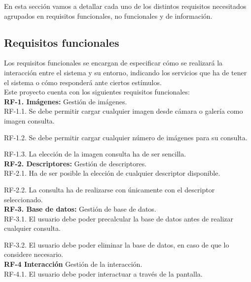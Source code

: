 En esta sección vamos a detallar cada uno de los distintos requisitos necesitados agrupados en requisitos funcionales, no funcionales y de información.\\

\subsection{Requisitos funcionales}

Los requisitos funcionales se encargan de especificar cómo se realizará la interacción entre el sistema y su entorno, indicando los servicios que ha de tener el sistema o cómo responderá ante ciertos estímulos.\\

Este proyecto cuenta con los siguientes requisitos funcionales:\\

\textbf{RF-1. Imágenes:} Gestión de imágenes.\\
 
   RF-1.1. Se debe permitir cargar cualquier imagen desde cámara o galería como imagen consulta.
   
   RF-1.2. Se debe permitir cargar cualquier número de imágenes para su consulta.
   
   RF-1.3. La elección de la imagen consulta ha de ser sencilla.\\
   
\textbf{RF-2. Descriptores:} Gestión de descriptores.\\    
   
   RF-2.1. Ha de ser posible la elección de cualquier descriptor disponible.
      
   RF-2.2. La consulta ha de realizarse con únicamente con el descriptor seleccionado.\\    
   
\textbf{RF-3. Base de datos:} Gestión de base de datos.\\    
   
   RF-3.1. El usuario debe poder precalcular la base de datos antes de realizar cualquier consulta.
   
   RF-3.2. El usuario debe poder eliminar la base de datos, en caso de que lo considere necesario.\\

\textbf{RF-4 Interacción} Gestión de la interacción.\\

   RF-4.1. El usuario debe poder interactuar a través de la pantalla.
   
